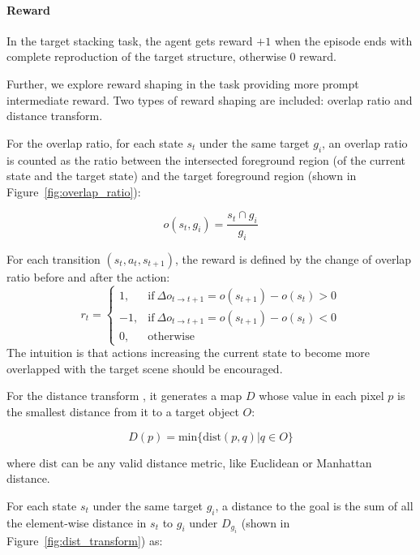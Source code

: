 \documentclass{article} %
\begin{document}
\paragraph{Reward}
In the target stacking task, the agent gets reward $+1$ when the episode ends with complete reproduction of the target structure, otherwise $0$ reward.

Further, we explore reward shaping \citep{ng1999policy} in the task providing more prompt intermediate reward. Two types of reward shaping are included: overlap ratio and distance transform. 

For the overlap ratio, for each state $s_t$ under the same target $g_i$, an overlap ratio is counted as the ratio between the intersected foreground region (of the current state and the target state) and the target foreground region (shown in Figure~\ref{fig:overlap_ratio}):

\begin{equation}\label{eq:ovl}
o(s_t,g_i) = \frac{s_t \cap g_i}{g_i}
\end{equation}

For each transition $(s_t, a_t, s_{t+1})$, the reward is defined by the change of overlap ratio before and after the action: 
\begin{equation}
    r_t =
    \begin{cases}
      1, & \text{if}\ \Delta o_{t\rightarrow t+1} = o(s_{t+1}) - o(s_t) >  0 \\
      -1, & \text{if}\ \Delta o_{t\rightarrow t+1} = o(s_{t+1}) - o(s_t) <  0\\
      0, & \text{otherwise}
    \end{cases}
\end{equation}
The intuition is that actions increasing the current state to become more overlapped with the target scene should be encouraged.

For the distance transform \citep{fabbri20082d}, it generates a map $D$ whose value in each pixel $p$ is the smallest distance from it to a target object $O$:

\begin{equation}
D(p) = \text{min}\{\text{dist}(p,q)|q\in O\}
\end{equation}

where $\text{dist}$ can be any valid distance metric, like Euclidean or Manhattan distance. 

For each state $s_t$ under the same target $g_i$, a distance to the goal is the sum of all the element-wise distance in $s_t$ to $g_i$ under $D_{g_i}$ (shown in Figure~\ref{fig:dist_transform}) as: 
\end{document}
